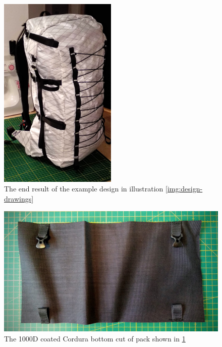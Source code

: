 \begin{figure}[ht]
  \centering
  \includegraphics[width=0.5\textwidth]{media/images/pack-side-full}
  \caption{The end result of the example design in illustration \ref{img:design-drawings}}
  \label{img:pack-side-full}
\end{figure}

\begin{figure}[ht]
  \includegraphics[width=\textwidth]{media/images/pack-bottom-cut}
  \caption{The 1000D coated Cordura bottom cut of pack shown in \ref{img:pack-side-full}}
  \label{img:pack-bottom-cut}
\end{figure}
